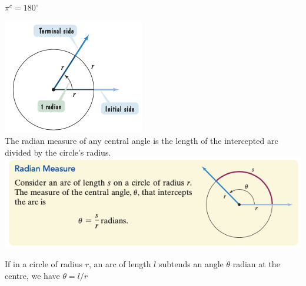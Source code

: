 \documentclass{book}
\begin{document}
	  \begin{mdframed}[backgroundcolor=yellow]
	  	$\pi^c = 180^\circ$ 
	  \end{mdframed}
	  
	  \includegraphics[scale=0.6]{radians} \\
	  
	  The radian measure of any central angle is the length of the intercepted arc divided by the circle’s radius.\\
	  
	  \includegraphics[scale=0.6]{radianmeasure} \\
	  
	  \begin{mdframed}[backgroundcolor=yellow]
	  	If in a circle of radius $r$, an arc of length $l$ subtends an angle $\theta$ radian at the centre, we have $\theta = l/r$
	  	\end{mdframed}
	  	
\end{document}
